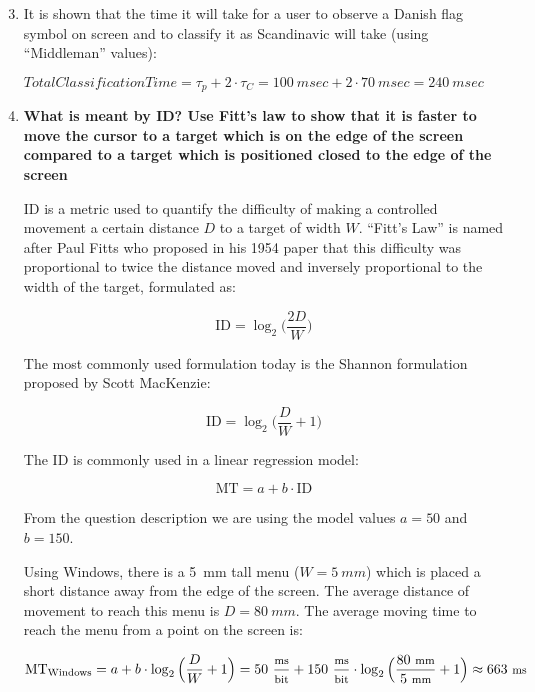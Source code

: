 \begin{enumerate}[label=\alph*)]
\setcounter{enumi}{2}

\item[] It is shown that the time it will take for a user to observe a Danish flag symbol on screen and to classify it as Scandinavic will take (using ``Middleman'' values):

$\textit{TotalClassificationTime} = \tau_p + 2 \cdot \tau_C = 100~\textit{msec} + 2 \cdot 70~\textit{msec} = 240~\textit{msec}$

\item \textbf{What is meant by \acf{ID}? Use Fitt's law to show that it is faster to move the cursor to a target which is on the edge of the screen compared to a target which is positioned closed to the edge of the screen}

\acf{ID} is a metric used to quantify the difficulty of making a controlled movement a certain distance $D$ to a target of width $W$. ``Fitt's Law'' is named after Paul Fitts who proposed in his 1954 paper that this difficulty was proportional to twice the distance moved and inversely proportional to the width of the target, formulated as:

\begin{displaymath}
\text{ID} = \log_2\big(\frac{2D}{W}\big)
\end{displaymath}

The most commonly used formulation today is the Shannon formulation proposed by Scott MacKenzie:

\begin{displaymath}
\text{ID} = \log_2\big(\frac{D}{W} + 1\big)
\end{displaymath}

The \ac{ID} is commonly used in a linear regression model:

\begin{displaymath}
\text{MT} = a + b \cdot \text{ID}
\end{displaymath}

From the question description we are using the model values $a = 50$ and $b = 150$.

Using Windows, there is a 5~mm tall menu ($W = 5~mm$) which is placed a short distance away from the edge of the screen. The average distance of movement to reach this menu is $D = 80~mm$. The average moving time to reach the menu from a point on the screen is:

\begin{displaymath}
\text{MT}_\text{Windows} = a + b \cdot \log_2\Big(\frac{D}{W} + 1\Big) = 50~{\footnotesize \frac{\text{ms}}{\text{bit}}} + 150~{\footnotesize \frac{\text{ms}}{\text{bit}}} \cdot \log_2\Big(\frac{80~\text{\footnotesize mm}}{5~\text{\footnotesize mm}} + 1\Big) \approx 663~\text{\footnotesize ms}
\end{displaymath}


\end{enumerate}
